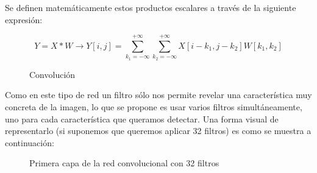 \documentclass[
  a4paper,
  DIV=11,
  numbers=noendperiod]{scrreprt}
\begin{document}
Se definen matemáticamente estos productos escalares a través de la
siguiente expresión:

\[
Y=X * W \rightarrow Y[i, j]=\sum_{k_1=-\infty}^{+\infty} \sum_{k_2=-\infty}^{+\infty} X\left[i-k_1, j-k_2\right] W\left[k_1, k_2\right]
\]

\begin{figure}


\caption{\label{fig-producto_convolucion}Convolución}

\end{figure}%

Como en este tipo de red un filtro sólo nos permite revelar una
característica muy concreta de la imagen, lo que se propone es usar
varios filtros simultáneamente, uno para cada característica que
queramos detectar. Una forma visual de representarlo (si suponemos que
queremos aplicar 32 filtros) es como se muestra a continuación:

\begin{figure}


\caption{\label{fig-primera-capa-convolucional}Primera capa de la red
convolucional con 32 filtros}

\end{figure}%
\end{document}
